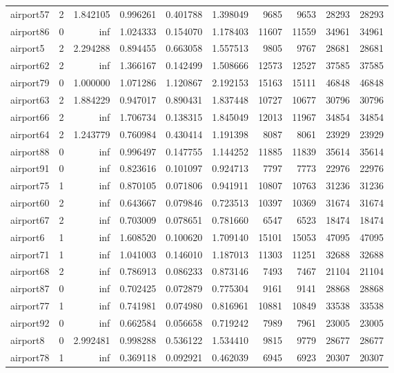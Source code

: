 \begin{longtable}{|l|r|r|r|r|r|r|r|r|r|}
airport57 & 2 & 1.842105 & 0.996261 & 0.401788 & 1.398049 & 9685 & 9653 & 28293 & 28293 \\
airport86 & 0 & inf & 1.024333 & 0.154070 & 1.178403 & 11607 & 11559 & 34961 & 34961 \\
airport5 & 2 & 2.294288 & 0.894455 & 0.663058 & 1.557513 & 9805 & 9767 & 28681 & 28681 \\
airport62 & 2 & inf & 1.366167 & 0.142499 & 1.508666 & 12573 & 12527 & 37585 & 37585 \\
airport79 & 0 & 1.000000 & 1.071286 & 1.120867 & 2.192153 & 15163 & 15111 & 46848 & 46848 \\
airport63 & 2 & 1.884229 & 0.947017 & 0.890431 & 1.837448 & 10727 & 10677 & 30796 & 30796 \\
airport66 & 2 & inf & 1.706734 & 0.138315 & 1.845049 & 12013 & 11967 & 34854 & 34854 \\
airport64 & 2 & 1.243779 & 0.760984 & 0.430414 & 1.191398 & 8087 & 8061 & 23929 & 23929 \\
airport88 & 0 & inf & 0.996497 & 0.147755 & 1.144252 & 11885 & 11839 & 35614 & 35614 \\
airport91 & 0 & inf & 0.823616 & 0.101097 & 0.924713 & 7797 & 7773 & 22976 & 22976 \\
airport75 & 1 & inf & 0.870105 & 0.071806 & 0.941911 & 10807 & 10763 & 31236 & 31236 \\
airport60 & 2 & inf & 0.643667 & 0.079846 & 0.723513 & 10397 & 10369 & 31674 & 31674 \\
airport67 & 2 & inf & 0.703009 & 0.078651 & 0.781660 & 6547 & 6523 & 18474 & 18474 \\
airport6 & 1 & inf & 1.608520 & 0.100620 & 1.709140 & 15101 & 15053 & 47095 & 47095 \\
airport71 & 1 & inf & 1.041003 & 0.146010 & 1.187013 & 11303 & 11251 & 32688 & 32688 \\
airport68 & 2 & inf & 0.786913 & 0.086233 & 0.873146 & 7493 & 7467 & 21104 & 21104 \\
airport87 & 0 & inf & 0.702425 & 0.072879 & 0.775304 & 9161 & 9141 & 28868 & 28868 \\
airport77 & 1 & inf & 0.741981 & 0.074980 & 0.816961 & 10881 & 10849 & 33538 & 33538 \\
airport92 & 0 & inf & 0.662584 & 0.056658 & 0.719242 & 7989 & 7961 & 23005 & 23005 \\
airport8 & 0 & 2.992481 & 0.998288 & 0.536122 & 1.534410 & 9815 & 9779 & 28677 & 28677 \\
airport78 & 1 & inf & 0.369118 & 0.092921 & 0.462039 & 6945 & 6923 & 20307 & 20307 \\

\end{longtable}
